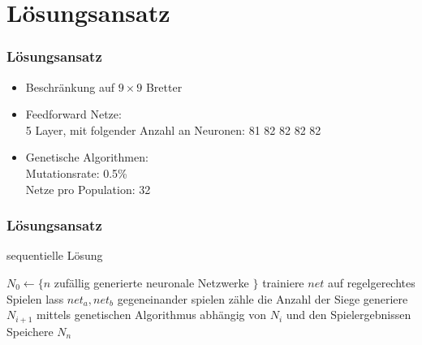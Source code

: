 \section{Lösungsansatz}

\begin{frame}
    \frametitle{Lösungsansatz}

    \begin{itemize}
        \item Beschränkung auf $9 \times 9$ Bretter
        \item Feedforward Netze:\\
            5 Layer, mit folgender Anzahl an Neuronen: 81 82 82 82 82
        \item Genetische Algorithmen:\\
            Mutationsrate: 0.5\%\\
            Netze pro Population: 32\\
    \end{itemize}
\end{frame}

\begin{frame}
    \frametitle{Lösungsansatz}

    \begin{algorithm}[H]
        \caption{sequentielle Lösung}
        \begin{algorithmic}[1]
            \State $N_0 \gets \{ n$ zufällig generierte neuronale Netzwerke $\}$
                \State trainiere $net$ auf regelgerechtes Spielen
            \EndFor
                    \State lass $net_a, net_b$ gegeneinander spielen
                    \State zähle die Anzahl der Siege
                \EndFor
                \State generiere $N_{i+1}$ mittels genetischen Algorithmus
                abhängig von $N_i$ und den Spielergebnissen
            \EndFor
            \State Speichere $N_n$
        \end{algorithmic}
    \end{algorithm}
\end{frame}

